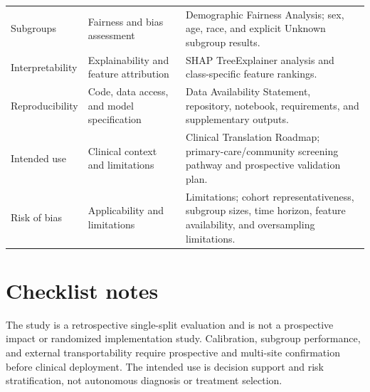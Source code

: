 \documentclass[preprint,12pt]{elsarticle}
\begin{document}
\begin{longtable}{p{}p{}p{}}
Subgroups & Fairness and bias assessment & Demographic Fairness Analysis; sex, age, race, and explicit Unknown subgroup results. \\
Interpretability & Explainability and feature attribution & SHAP TreeExplainer analysis and class-specific feature rankings. \\
Reproducibility & Code, data access, and model specification & Data Availability Statement, repository, notebook, requirements, and supplementary outputs. \\
Intended use & Clinical context and limitations & Clinical Translation Roadmap; primary-care/community screening pathway and prospective validation plan. \\
Risk of bias & Applicability and limitations & Limitations; cohort representativeness, subgroup sizes, time horizon, feature availability, and oversampling limitations. \\
\bottomrule
\end{longtable}

\section*{Checklist notes}
The study is a retrospective single-split evaluation and is not a prospective impact or randomized implementation study. Calibration, subgroup performance, and external transportability require prospective and multi-site confirmation before clinical deployment. The intended use is decision support and risk stratification, not autonomous diagnosis or treatment selection.
\end{document}
